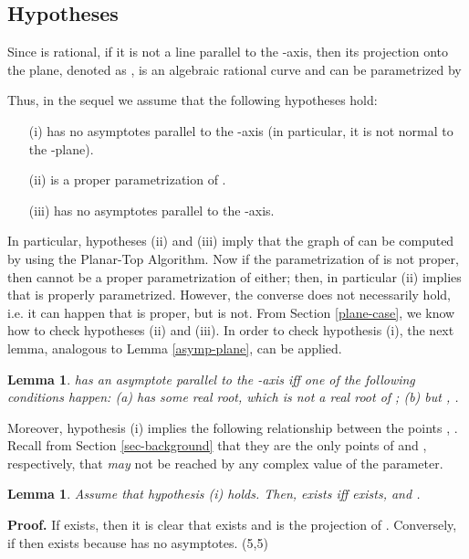 \documentclass{elsart}
\def\qed{\hfill  \framebox(5,5){}}
\newtheorem{lemma}[theorem]{{\bf Lemma}}
\begin{document}
\subsection{Hypotheses}\label{hyp-3d}

Since  is rational, if it is not a line parallel to
the -axis, then its projection onto the  plane, denoted as
, is an algebraic rational curve and can
be parametrized by

Thus, in the sequel we assume that the following hypotheses hold:

\begin{itemize}
\item [(i)]  has no asymptotes parallel to the -axis (in particular, it is not normal to the -plane).
\item [(ii)]  is a proper parametrization of .
\item [(iii)]  has no asymptotes parallel to the -axis.
\end{itemize}

In particular, hypotheses (ii) and (iii) imply that the graph of
 can be computed by using the Planar-Top
Algorithm. Now if the  parametrization  of  is not proper, then  cannot be a proper
parametrization of  either; then, in
particular (ii) implies that  is properly
parametrized. However, the converse does not necessarily hold,
i.e. it can happen that  is proper, but  is
not. From Section \ref{plane-case}, we know how to check
hypotheses (ii) and (iii). In order to check hypothesis (i), the
next lemma, analogous to Lemma \ref{asymp-plane}, can be applied.

\begin{lemma} \label{asint-space}
 has an asymptote parallel to the -axis iff one of the following conditions happen: (a)  has some real root, which is not a real root of ; (b)  but , .
\end{lemma}

Moreover, hypothesis (i) implies the following relationship between the points , . Recall from Section \ref{sec-background} that they are the only points of  and , respectively, that {\it may} not be reached by any complex value of the parameter.

\begin{lemma} \label{inf-points}
Assume that hypothesis (i) holds. Then,  exists iff  exists, and .
\end{lemma}

{\bf Proof.} If  exists, then it is clear that
 exists and is the projection of .
Conversely, if 
then  exists because   has no
asymptotes. \qed
\end{document}
